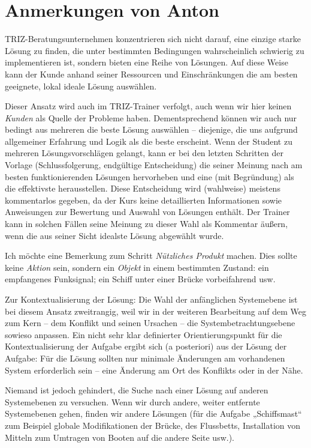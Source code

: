 \documentclass[11pt,a4paper]{article}
\begin{document}
\section{Anmerkungen von Anton}

TRIZ-Beratungsunternehmen konzentrieren sich nicht darauf, eine einzige starke
Lösung zu finden, die unter bestimmten Bedingungen wahrscheinlich schwierig zu
implementieren ist, sondern bieten eine Reihe von Lösungen. Auf diese Weise
kann der Kunde anhand seiner Ressourcen und Einschränkungen die am besten
geeignete, lokal ideale Lösung auswählen.
 
Dieser Ansatz wird auch im TRIZ-Trainer verfolgt, auch wenn wir hier keinen
\emph{Kunden} als Quelle der Probleme haben. Dementsprechend können wir auch
nur bedingt aus mehreren die beste Lösung auswählen -- diejenige, die uns
aufgrund allgemeiner Erfahrung und Logik als die beste erscheint. Wenn der
Student zu mehreren Lösungsvorschlägen gelangt, kann er bei den letzten
Schritten der Vorlage (Schlussfolgerung, endgültige Entscheidung) die seiner
Meinung nach am besten funktionierenden Lösungen hervorheben und eine (mit
Begründung) als die effektivste herausstellen. Diese Entscheidung wird
(wahlweise) meistens kommentarlos gegeben, da der Kurs keine detaillierten
Informationen sowie Anweisungen zur Bewertung und Auswahl von Lösungen
enthält. Der Trainer kann in solchen Fällen seine Meinung zu dieser Wahl als
Kommentar äußern, wenn die aus seiner Sicht idealste Lösung abgewählt wurde.

Ich möchte eine Bemerkung zum Schritt \emph{Nützliches Produkt} machen. Dies
sollte keine \emph{Aktion} sein, sondern ein \emph{Objekt} in einem bestimmten
Zustand: ein empfangenes Funksignal; ein Schiff unter einer Brücke
vorbeifahrend usw.
 
Zur Kontextualisierung der Lösung: Die Wahl der anfänglichen Systemebene ist
bei diesem Ansatz zweitrangig, weil wir in der weiteren Bearbeitung auf dem
Weg zum Kern -- dem Konflikt und seinen Ursachen -- die
Systembetrachtungsebene sowieso anpassen. Ein nicht sehr klar definierter
Orientierungspunkt für die Kontextualisierung der Aufgabe ergibt sich (a
posteriori) aus der Lösung der Aufgabe: Für die Lösung sollten nur minimale
Änderungen am vorhandenen System erforderlich sein -- eine Änderung am Ort des
Konflikts oder in der Nähe.

Niemand ist jedoch gehindert, die Suche nach einer Lösung auf anderen
Systemebenen zu versuchen. Wenn wir durch andere, weiter entfernte
Systemebenen gehen, finden wir andere Lösungen (für die Aufgabe „Schiffsmast“
zum Beispiel globale Modifikationen der Brücke, des Flussbetts, Installation
von Mitteln zum Umtragen von Booten auf die andere Seite usw.).
\end{document}
